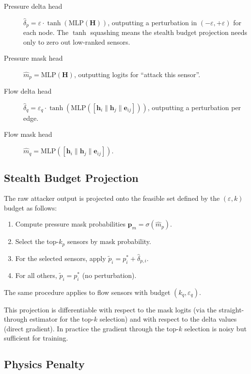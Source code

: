 \begin{description}
  \item[Pressure delta head] $\hat{\delta}_p = \varepsilon \cdot
    \tanh(\mathrm{MLP}(\mathbf{H}))$, outputting a perturbation in
    $(-\varepsilon, +\varepsilon)$ for each node. The $\tanh$
    squashing means the stealth budget projection needs only
    to zero out low-ranked sensors.
  \item[Pressure mask head] $\hat{m}_p = \mathrm{MLP}(\mathbf{H})$,
    outputting logits for ``attack this sensor''.
  \item[Flow delta head] $\hat{\delta}_q = \varepsilon_q \cdot
    \tanh(\mathrm{MLP}([\mathbf{h}_i \| \mathbf{h}_j \| \mathbf{e}_{ij}]))$,
    outputting a perturbation per edge.
  \item[Flow mask head] $\hat{m}_q = \mathrm{MLP}([\mathbf{h}_i \|
    \mathbf{h}_j \| \mathbf{e}_{ij}])$.
\end{description}

\subsection{Stealth Budget Projection}
\label{sec:budget}

The raw attacker output is projected onto the feasible set defined
by the $(\varepsilon, k)$ budget as follows:

\begin{enumerate}
  \item Compute pressure mask probabilities
    $\mathbf{p}_m = \sigma(\hat{m}_p)$.
  \item Select the top-$k_p$ sensors by mask probability.
  \item For the selected sensors, apply
    $\tilde{p}_i = p_i^* + \hat{\delta}_{p,i}$.
  \item For all others, $\tilde{p}_i = p_i^*$ (no perturbation).
\end{enumerate}
The same procedure applies to flow sensors with budget $(k_q,
\varepsilon_q)$.

This projection is differentiable with respect to the mask
logits (via the straight-through estimator for the top-$k$
selection) and with respect to the delta values (direct gradient).
In practice the gradient through the top-$k$ selection is noisy but
sufficient for training.

\subsection{Physics Penalty}

